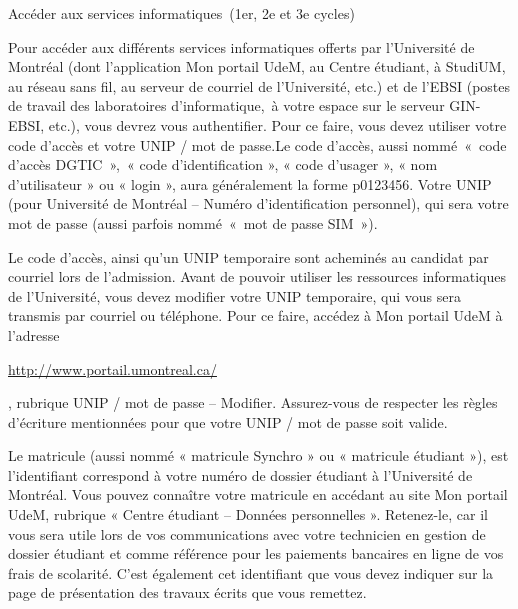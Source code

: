 \documentclass [12 pt]{article}
\begin{document}
        Accéder aux services informatiques (1er, 2e et 3e cycles)
        
            Pour accéder aux différents services informatiques offerts par l'Université de
                Montréal (dont l'application Mon portail UdeM, au Centre étudiant, à
                StudiUM, au réseau sans fil, au serveur de courriel de l'Université,
                etc.) et de l’EBSI (postes de travail des laboratoires d'informatique, à
                votre espace sur le serveur GIN-EBSI, etc.), vous devrez vous authentifier.
            Pour ce faire, vous devez utiliser votre code d'accès et votre UNIP / mot de
                    passe.Le code d'accès, aussi nommé « code d'accès
                DGTIC », « code d'identification », « code d'usager », « nom d'utilisateur
                » ou « login », aura généralement la forme
                    p0123456. Votre UNIP (pour Université de Montréal – Numéro
                d'identification personnel), qui sera votre mot de passe (aussi parfois
                nommé « mot de passe SIM »).
            
                Le code d'accès, ainsi qu'un UNIP temporaire sont acheminés au candidat par
                    courriel lors de l'admission.
                Avant de pouvoir utiliser les ressources
                    informatiques de l'Université, vous devez modifier votre UNIP temporaire, qui
                    vous sera transmis par courriel ou téléphone. Pour ce faire, accédez à Mon
                    portail UdeM à l'adresse 
                
        \href{
        http://www.portail.umontreal.ca/
        } {
        http://www.portail.umontreal.ca/
        }
    
                , rubrique UNIP / mot de passe – Modifier.
                    Assurez-vous de respecter les règles d'écriture mentionnées pour que votre UNIP
                    / mot de passe soit valide.
            
            Le matricule (aussi nommé « matricule Synchro » ou « matricule étudiant »), est
                l'identifiant correspond à votre numéro de dossier étudiant à l'Université de
                Montréal. Vous pouvez connaître votre matricule en accédant au site Mon portail
                UdeM, rubrique « Centre étudiant – Données personnelles ». Retenez-le, car il vous
                sera utile lors de vos communications avec votre technicien en gestion de dossier
                étudiant et comme référence pour les paiements bancaires en ligne de vos frais de
                scolarité. C'est également cet identifiant que vous devez indiquer sur la page de
                présentation des travaux écrits que vous remettez.
        
\end{document}
